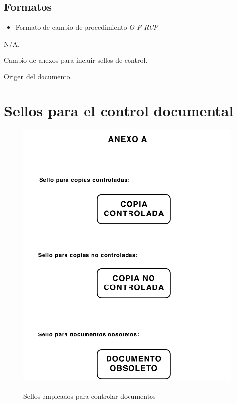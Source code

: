 \subsection{Formatos}
\begin{itemize}
    \item Formato de cambio de procedimiento \emph{O-F-RCP}
\end{itemize}

\begin{changelog}[title=Registro de cambios,simple, sectioncmd=\subsection*,label=changelog-\thesection-\MayorVer.\MenorVer]
	\begin{version}[v=3, date=2023--03--06]
		\item N/A.
	\end{version}

	\begin{version}[v=2, date=2022--03--02]
		\item Cambio de anexos para incluir sellos de control.
	\end{version}

    \begin{version}[v=1, date=2021--09--14]
		\item Origen del documento.
	\end{version}
\end{changelog}

\appendix
\newpage
\section{Sellos para el control documental}

\begin{figure}[h!]
    \centering
    \includegraphics[width=0.5\linewidth]{A1.png}
    \label{an1}
    \caption{Sellos empleados para controlar documentos}
\end{figure}

